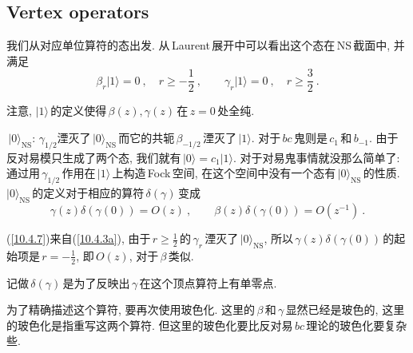 \subsection*{Vertex operators}
我们从对应单位算符的态出发. 从\,Laurent\,展开中可以看出这个态在\,NS\,截面中, 并满足
\begin{equation}
    \beta_{r}\lvert 1\rangle =0\:, \quad r\geq -\frac{1}{2} \:, \qquad
    \gamma_{r}\lvert1\rangle=0 \:, \quad r\geq \frac{3}{2}\:. \label{10.4.6}
\end{equation}
\begin{tcolorbox}
注意, $\lvert 1\rangle\,$的定义使得$\,\beta(z),\gamma(z)\,$在$\,z=0\,$处全纯.
\end{tcolorbox}
$\,\lvert 0\rangle_{\mathrm{NS}}$: $\gamma_{1/2}$湮灭了$\,\lvert 0\rangle_{\mathrm{NS}}\,$而它的共轭$\,\beta_{-1/2}\,$湮灭了$\,\lvert1\rangle$. 对于$\,bc\,$鬼则是$\,c_{1}\,$和$\,b_{-1}$. 由于反对易模只生成了两个态, 我们就有$\,\lvert0\rangle =c_{1}\lvert1\rangle$. 对于对易鬼事情就没那么简单了: 通过用$\,\gamma_{1/2}\,$作用在$\,\lvert1\rangle\,$上构造\,Fock\,空间, 在这个空间中没有一个态有$\,\lvert 0\rangle_{\mathrm{NS}}\,$的性质. $\lvert 0\rangle_{\mathrm{NS}}\,$的定义对于相应的算符$\,\delta(\gamma)\,$变成
\begin{equation}
    \gamma(z)\delta(\gamma(0)) = O(z) \:, \qquad
    \beta(z) \delta(\gamma(0)) = O(z^{-1})\:. \label{10.4.7}
\end{equation}
\begin{tcolorbox}
    (\ref{10.4.7})来自(\ref{10.4.3a}), 由于$\,r\geq \frac{1}{2}\,$的$\,\gamma_{r}\,$湮灭了$\,\lvert 0\rangle_{\mathrm{NS}}$, 所以$\,\gamma(z)\delta(\gamma(0))\,$的起始项是$\,r=-\frac{1}{2}$, 即$\,O(z)$, 对于$\,\beta\,$类似.
\end{tcolorbox}
\noindent 记做$\,\delta(\gamma)\,$是为了反映出$\,\gamma\,$在这个顶点算符上有单零点. 

为了精确描述这个算符, 要再次使用玻色化. 这里的$\,\beta\,$和$\,\gamma\,$显然已经是玻色的, 这里的玻色化是指重写这两个算符. 但这里的玻色化要比反对易$\,bc\,$理论的玻色化要复杂些.

